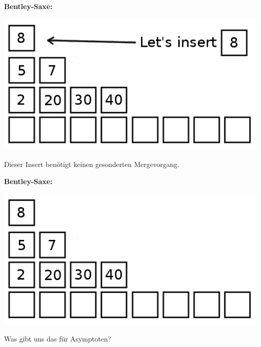 \documentclass{beamer}
\begin{document}
\begin{frame}
\textbf{Bentley-Saxe:}
\begin{center}
\includegraphics[scale=0.5]{bentley_saxe_04.png} 
\end{center}

Dieser Insert benötigt keinen gesonderten Mergevorgang.
\end{frame}


\begin{frame}
\textbf{Bentley-Saxe:}
\begin{center}
\includegraphics[scale=0.5]{bentley_saxe_05.png} 
\end{center}

Was gibt uns das für Asymptoten?
\end{frame}

\end{document}
